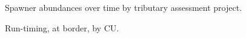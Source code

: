 \documentclass[11pt]{book}
\begin{document}
\begin{figure}[htb]

{\centering {} 

}

\caption{Spawner abundances over time by tributary assessment project.}\label{fig:fig-trib-spawn}
\end{figure}

\begin{figure}[htb]

{\centering {} 

}

\caption{Run-timing, at border, by CU.}\label{fig:fig-run-timing}
\end{figure}
\end{document}
